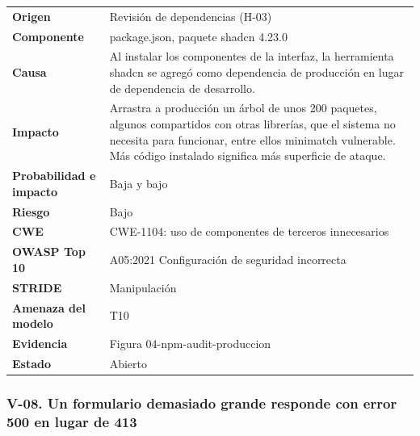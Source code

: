 \documentclass[12pt, letterpaper]{article}
\begin{document}
\begingroup\small\setlength{\tabcolsep}{4pt}\renewcommand{\arraystretch}{1.25}
\begin{longtable}{L{0.24}L{0.70}}
\toprule
\endfirsthead
\toprule
\endhead
\bottomrule
\endfoot
\textbf{Origen} & Revisión de dependencias (H-03) \\
\textbf{Componente} & package.json, paquete shadcn 4.23.0 \\
\textbf{Causa} & Al instalar los componentes de la interfaz, la herramienta shadcn se agregó como dependencia de producción en lugar de dependencia de desarrollo. \\
\textbf{Impacto} & Arrastra a producción un árbol de unos 200 paquetes, algunos compartidos con otras librerías, que el sistema no necesita para funcionar, entre ellos minimatch vulnerable. Más código instalado significa más superficie de ataque. \\
\textbf{Probabilidad e impacto} & Baja y bajo \\
\textbf{Riesgo} & Bajo \\
\textbf{CWE} & CWE-1104: uso de componentes de terceros innecesarios \\
\textbf{OWASP Top 10} & A05:2021 Configuración de seguridad incorrecta \\
\textbf{STRIDE} & Manipulación \\
\textbf{Amenaza del modelo} & T10 \\
\textbf{Evidencia} & Figura 04-npm-audit-produccion \\
\textbf{Estado} & Abierto \\
\end{longtable}
\endgroup

\subsubsection*{V-08. Un formulario demasiado grande responde con error 500 en lugar de 413}
\end{document}
